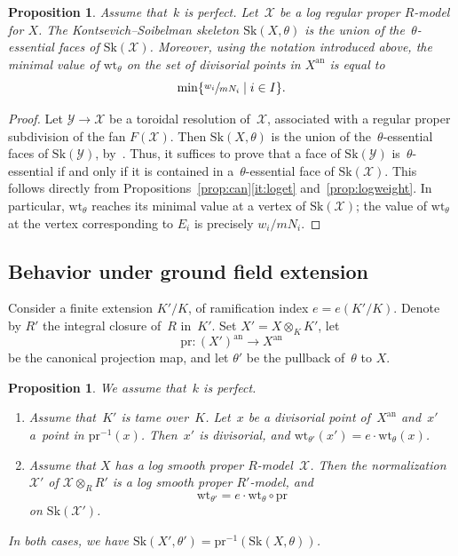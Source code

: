 \documentclass[11pt]{article}
\newtheorem{prop}[equation]{Proposition}
\theoremstyle{definition}
\numberwithin{equation}{subsection}
\newcommand{\cX}{\ensuremath{\mathscr{X}}}
\newcommand{\cY}{\ensuremath{\mathscr{Y}}}
\newcommand{\an}{\mathrm{an}}
\newcommand{\pr}{\mathrm{pr}}
\newcommand{\Sk}{\mathrm{Sk}}
\newcommand{\wt}{\mathrm{wt}}
\let\form\theta
\begin{document}
\begin{prop}\label{prop:sklogmodel}
Assume that~$k$ is perfect. Let~$\cX$ be a log regular proper $R$\nobreakdash-model for $X$.
The Kontsevich--Soibelman skeleton $\Sk(X,\form)$ is the union of the~$\form$-essential faces of $\Sk(\cX)$.
Moreover, using the notation introduced above, the minimal value of $\wt_{\form}$ on the set of divisorial points in $X^{\an}$ is equal to
\[
\min\{\sfrac{w_i}{mN_i}\mid i\in I\}.
\]
\end{prop}

\begin{proof}
Let $\cY\to \cX$ be a toroidal resolution of~$\cX$, associated with a regular proper subdivision of the fan $F(\cX)$.
Then $\Sk(X,\form)$ is the union of the~$\form$-essential faces of $\Sk(\cY)$, by~\cite[4.7.5]{MuNi}.
Thus, it suffices to prove that a face of $\Sk(\cY)$ is~$\form$-essential if and only if it is contained in a~$\form$-essential face of $\Sk(\cX)$.
This follows directly from Propositions~\ref{prop:can}\eqref{it:loget} and~\ref{prop:logweight}. In particular, $\wt_{\form}$ reaches its minimal value at a vertex of $\Sk(\cX)$; the value of $\wt_{\form}$ at the vertex corresponding to $E_i$ is precisely $w_i/mN_i$.
\end{proof}

\subsection{Behavior under ground field extension}
Consider a finite extension $K'/K$, of ramification index $e=e(K'/K)$. Denote by $R'$ the integral closure of~$R$ in~$K'$. Set $X'=X\otimes_KK'$, let
\begin{equation*}
\pr\colon (X')^{\an}\to X^{\an}
\end{equation*}
be the canonical projection map, and let $\form'$ be the pullback of~$\form$ to $X$.
\begin{prop}\label{prop:skbasech}
We assume that~$k$ is perfect.
\begin{enumerate}
\item \label{it:skbasech-tame} Assume that~$K'$ is tame over~$K$. Let~$x$ be a divisorial point of~$X^{\an}$ and~$x'$ a~point in $\pr^{-1}(x)$. Then~$x'$ is divisorial, and
$\wt_{\form'}(x')=e\cdot \wt_{\form}(x)$.
\item \label{it:skbasech-logsm} Assume that $X$ has a log smooth proper $R$\nobreakdash-model~$\cX$. Then the normalization~$\cX'$ of $\cX\otimes_R R'$ is a log smooth proper $R'$-model, and
\[
\wt_{\form'}=e\cdot \wt_{\form}\circ \pr
\]
on $\Sk(\cX')$.
\end{enumerate}
In both cases, we have $\Sk(X',\form')=\pr^{-1}(\Sk(X,\form))$.
\end{prop}
\end{document}
